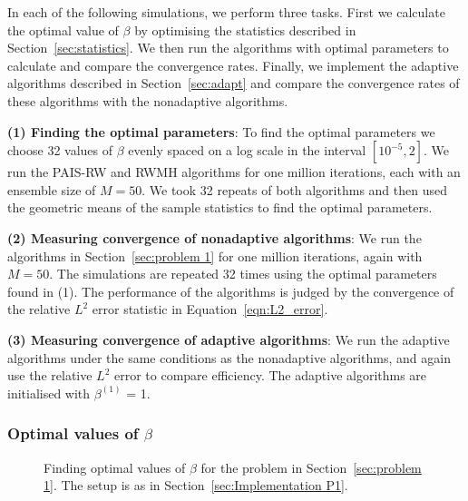 \documentclass[final]{siamltex}
\begin{document}
In each of the following simulations, we perform three tasks. First we calculate the optimal value of $\beta$ by optimising the statistics described in Section~\ref{sec:statistics}. We then run the algorithms with optimal parameters to calculate and compare the convergence rates. Finally, we implement the adaptive algorithms described in Section~\ref{sec:adapt} and compare the convergence rates of these algorithms with the nonadaptive algorithms.

{\bf (1) Finding the optimal parameters}: To find the optimal
parameters we choose 32 values of $\beta$ evenly spaced on a log scale
in the interval $[10^{-5}, 2]$. We run the PAIS-RW and RWMH algorithms for one million iterations, each with an ensemble size of $M=50$. We took 32 repeats of both algorithms and then used the geometric means of the sample statistics to find the optimal parameters.

{\bf (2) Measuring convergence of nonadaptive algorithms}: We run the algorithms in Section~\ref{sec:problem 1} for one million iterations, again with $M=50$. The simulations are repeated 32 times using the optimal parameters found in (1). The performance of the algorithms is judged by the convergence of the relative $L^2$ error statistic in Equation~\ref{eqn:L2_error}.

{\bf (3) Measuring convergence of adaptive algorithms}: We run the
adaptive algorithms under the same conditions as the nonadaptive
algorithms, and again use the relative $L^2$ error to compare
efficiency. The adaptive algorithms are initialised with $\beta^{(1)}$ = 1.


\subsubsection{Optimal values of $\beta$}\label{sec:Optimal values P1}

\begin{figure}[htb]
\centering
{}
\caption{Finding optimal values of $\beta$ for the problem in Section~\ref{sec:problem 1}. The setup is as in Section~\ref{sec:Implementation P1}.}
\label{fig:P1 opt beta}
\end{figure}
\end{document}
